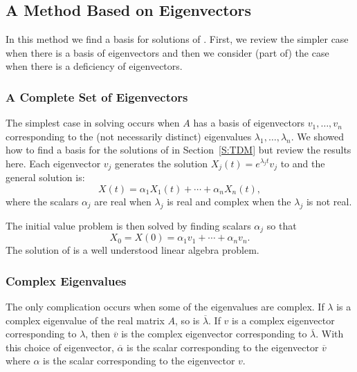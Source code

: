 \documentclass{ximera}
\begin{document}
\subsection*{A Method Based on Eigenvectors}
 
In this method we find a basis for solutions of .  First, we 
review the simpler case when there is a basis of eigenvectors and then we 
consider (part of) the case when there is a deficiency of eigenvectors.

\subsubsection*{A Complete Set of Eigenvectors}

The simplest case in solving  occurs when $A$ has a basis of 
eigenvectors $v_1,\ldots,v_n$ corresponding to the (not necessarily distinct) 
eigenvalues $\lambda_1,\ldots,\lambda_n$.  We showed how to find a basis for
the solutions of  in Section~\ref{S:TDM} but review the results
here.  Each eigenvector $v_j$ generates the solution 
$X_j(t)=e^{\lambda_j t}v_j$ to  and the general solution is:
\begin{equation} \label{E:gensolns}
X(t) = \alpha_1 X_1(t) + \cdots + \alpha_nX_n(t),
\end{equation}
where the scalars $\alpha_j$ are real when $\lambda_j$ is real and complex
when the $\lambda_j$ is not real.  

The initial value problem is then solved 
by finding scalars $\alpha_j$ so that
\begin{equation}  \label{E:gensolnsic}
X_0 = X(0) =\alpha_1v_1 + \cdots + \alpha_nv_n.
\end{equation}
The solution of  is a well understood linear algebra 
problem.   

\subsubsection*{Complex Eigenvalues}

The only complication occurs when some of the eigenvalues are complex. 
If $\lambda$ is a complex eigenvalue of the real matrix $A$, so is 
$\overline{\lambda}$.  If $v$ is a complex eigenvector corresponding to 
$\lambda$, then $\overline{v}$ is the complex eigenvector corresponding to 
$\overline{\lambda}$.  With this choice of eigenvector, $\overline{\alpha}$ 
is the scalar corresponding to the eigenvector $\overline{v}$ where $\alpha$
is the scalar corresponding to the eigenvector $v$.
\end{document}
